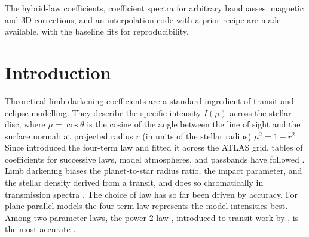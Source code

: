 \documentclass{aa}
\begin{document}
{The hybrid-law coefficients, coefficient spectra for arbitrary bandpasses,
magnetic and 3D corrections, and an interpolation code with a prior recipe
are made available, with the baseline fits for reproducibility.}


\maketitle

\section{Introduction}
Theoretical limb-darkening coefficients are a standard ingredient of transit
and eclipse modelling. They describe the specific intensity $I(\mu)$ across
the stellar disc, where $\mu=\cos\theta$ is the cosine of the angle between
the line of sight and the surface normal; at projected radius $r$ (in units of
the stellar radius) $\mu^2=1-r^2$. Since \citet{claret2000} introduced the four-term law and
fitted it across the ATLAS grid, tables of coefficients for successive laws,
model atmospheres, and passbands have followed
\citep{claretbloemen2011,claret2012,claret2013,claret2017,claret2018,claretsouthworth2022,claretsouthworth2023,claret2025}.
Limb darkening biases the planet-to-star radius ratio, the impact parameter,
and the stellar density derived from a transit, and does so chromatically in
transmission spectra
\citep{csizmadia2013,espinoza2015,espinoza2016,morello2017,patel2022}. The
choice of law has so far been driven by accuracy. For plane-parallel models
the four-term law represents the model intensities best. Among two-parameter
laws, the power-2 law \citep{hestroffer1997}, introduced to transit work by
\citet{morello2017}, is the most accurate
\citep{maxted2018,claretsouthworth2022}.
\end{document}
